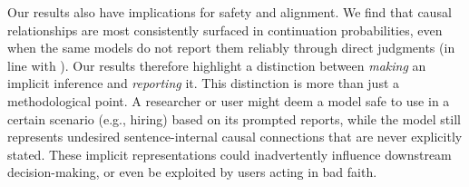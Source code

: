 \documentclass[11pt]{article}
\begin{document}
Our results also have implications for safety and alignment. We find that causal relationships are most consistently surfaced in continuation probabilities, even when the same models do not report them reliably through direct judgments (in line with \citealt{hu-levy-2023-prompting}). Our results therefore highlight a distinction between \emph{making} an implicit inference and \emph{reporting} it. This distinction is more than just a methodological point. A researcher or user might deem a model safe to use in a certain scenario (e.g., hiring) based on its prompted reports, while the model still represents undesired sentence-internal causal connections that are never explicitly stated. These implicit representations could inadvertently influence downstream decision-making, or even be exploited by users acting in bad faith. %


\end{document}
